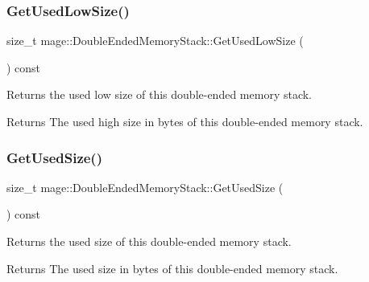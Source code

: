 \subsubsection{\texorpdfstring{Get\+Used\+Low\+Size()}{GetUsedLowSize()}}
{\footnotesize\ttfamily size\+\_\+t mage\+::\+Double\+Ended\+Memory\+Stack\+::\+Get\+Used\+Low\+Size (\begin{DoxyParamCaption}{ }\end{DoxyParamCaption}) const\hspace{0.3cm}{\ttfamily [noexcept]}}

Returns the used low size of this double-\/ended memory stack.

\begin{DoxyReturn}{Returns}
The used high size in bytes of this double-\/ended memory stack. 
\end{DoxyReturn}
\hypertarget{classmage_1_1_double_ended_memory_stack_ae9c3c9a0f4e330b20ef63e0a21b91459}{}\label{classmage_1_1_double_ended_memory_stack_ae9c3c9a0f4e330b20ef63e0a21b91459} 
\subsubsection{\texorpdfstring{Get\+Used\+Size()}{GetUsedSize()}}
{\footnotesize\ttfamily size\+\_\+t mage\+::\+Double\+Ended\+Memory\+Stack\+::\+Get\+Used\+Size (\begin{DoxyParamCaption}{ }\end{DoxyParamCaption}) const\hspace{0.3cm}{\ttfamily [noexcept]}}

Returns the used size of this double-\/ended memory stack.

\begin{DoxyReturn}{Returns}
The used size in bytes of this double-\/ended memory stack. 
\end{DoxyReturn}
\hypertarget{classmage_1_1_double_ended_memory_stack_aafcc4b3cd8d87d75cc3de53994b6ef7e}{}\label{classmage_1_1_double_ended_memory_stack_aafcc4b3cd8d87d75cc3de53994b6ef7e} 
